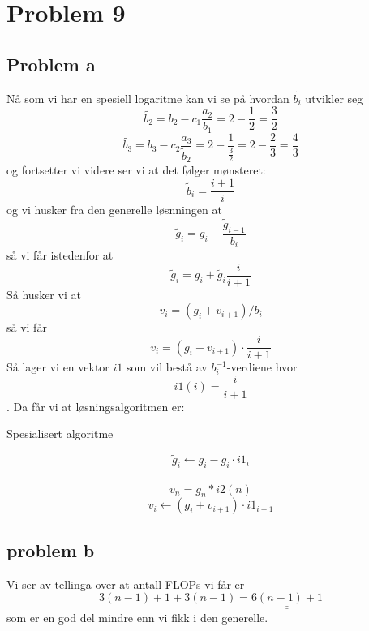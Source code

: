 \documentclass[english,notitlepage]{revtex4-1}  %
\begin{document}
\section*{Problem 9}

\subsection*{Problem a}
Nå som vi har en spesiell logaritme kan vi se på hvordan $\tilde{b_i}$ utvikler seg
$$
\tilde{b_2}=b_2-c_1\frac{a_2}{b_1}=2-\frac{1}{2}=\frac{3}{2}
$$
$$
\tilde{b_3}=b_3-c_2\frac{a_3}{\tilde{b}_2}=2-\frac{1}{\frac{3}{2}}=2-\frac{2}{3}=\frac{4}{3}
$$
og fortsetter vi videre ser vi at det følger mønsteret:
$$
\tilde{b}_i=\frac{i+1}{i}
$$
og vi husker fra den generelle løsnningen at 
$$
\tilde{g}_i=g_i-\frac{\tilde{g}_{i-1}}{b_i}
$$
så vi får istedenfor at
$$
\tilde{g}_i=g_i+\tilde{g}_i\frac{i}{i+1}
$$
Så husker vi at 
$$
v_i=(g_i+v_{i+1})/b_i
$$
så vi får
$$
v_i=(g_i-v_{i+1})\cdot\frac{i}{i+1}
$$
Så lager vi en vektor $i1$ som vil bestå av $b_i^{-1}$-verdiene hvor $$i1(i)=\frac{i}{i+1}$$. Da får vi at løsningsalgoritmen er:
\begin{algorithm}[H]
	\caption{Spesialisert algoritme}\label{algo:spec}
	\begin{algorithmic}
	 
	\State $$\widetilde{g}_{i} \leftarrow g_{i} - g_i \cdot i1_i$$  \\
	\EndFor {}
	\State $$v_n=g_n*i2(n)$$ 
	 
	\State $$v_i \leftarrow (g_i+v_{i+1})\cdot i1_{i+1}$$  
	\EndFor {}
	\end{algorithmic}
\end{algorithm}

\subsection*{problem b}
Vi ser av tellinga over at antall FLOPs vi får er
$$
3(n-1)+1+3(n-1)=\underline{\underline{6(n-1)+1}}
$$
som er en god del mindre enn vi fikk i den generelle.

\end{document}
